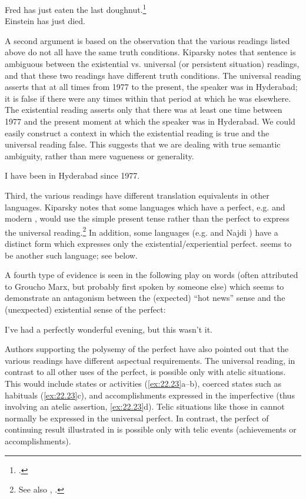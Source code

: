\ea \label{ex:22.20}
\ea Fred has just eaten the last doughnut.\footnote{\citet{Kiparsky2002}.} \\
\ex Einstein has just died.
                       \z
\z


A second argument is based on the observation that the various readings listed above do not all have the same truth conditions. Kiparsky notes that sentence  is ambiguous between the existential vs. universal (or persistent situation) readings, and that these two readings have different truth conditions. The universal reading asserts that at all times from 1977 to the present, the speaker was in Hyderabad; it is false if there were any times within that period at which he was elsewhere. The existential reading asserts only that there was at least one time between 1977 and the present moment at which the speaker was in Hyderabad. We could easily construct a context in which the existential reading is true and the universal reading false. This suggests that we are dealing with true semantic ambiguity, rather than mere vagueness or generality.


\ea \label{ex:22.21}
I have been in Hyderabad since 1977.
\z


Third, the various readings have different translation equivalents in other languages. Kiparsky notes that some languages which have a perfect, e.g.  and modern , would use the simple present tense rather than the perfect to express the universal reading.\footnote{See also \citet{Comrie1976}, \citet{Klein2009}.} In addition, some languages (e.g.  and Najdi ) have a distinct form which expresses only the existential/experiential perfect.  seems to be another such language; see  below.



A fourth type of evidence is seen in the following play on words (often attributed to Groucho Marx, but probably first spoken by someone else) which seems to demonstrate an antagonism between the (expected) “hot news” sense and the (unexpected) existential sense of the perfect:


\ea \label{ex:22.22}
I’ve had a perfectly wonderful evening, but this wasn’t it.
\z


Authors supporting the polysemy of the perfect have also pointed out that the various readings have different aspectual requirements. The universal reading, in contrast to all other uses of the perfect, is possible only with atelic situations. This would include states or activities (\ref{ex:22.23}a--b), coerced states such as habituals (\ref{ex:22.23}c), and accomplishments expressed in the imperfective (thus involving an atelic assertion, \ref{ex:22.23}d). Telic situations like those in  cannot normally be expressed in the universal perfect. In contrast, the perfect of continuing result illustrated in  is possible only with telic events (achievements or accomplishments).


